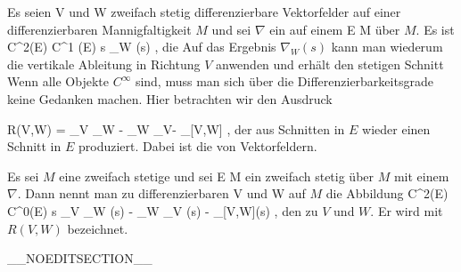 \setcounter{section}{28}


Es seien
\mathkor {} {V} {und} {W} {}
zweifach stetig differenzierbare Vektorfelder auf einer differenzierbaren Mannigfaltigkeit $M$ und sei $\nabla$ ein
auf einem
 { E } { M
} {}
über $M$. Es ist
 {C^2(E) } { C^1 (E)
} { s } { \nabla_W (s)
} {,}
die
Auf das Ergebnis $\nabla_W (s)$ kann man wiederum die vertikale Ableitung in Richtung $V$ anwenden und erhält den stetigen Schnitt
 Wenn alle Objekte $C^\infty$ sind, muss man sich über die Differenzierbarkeitsgrade keine Gedanken machen. Hier betrachten wir den Ausdruck

\mavergleichskettedisp
{\vergleichskette
{ R(V,W)
}
{ =} { \nabla_V \nabla_W - \nabla_W \nabla_V- \nabla_{[V,W]}
}
{ } {
}
{ } {
}
{ } {
}
}
{}{}{,}
der aus
 {} {}
Schnitten in $E$ wieder einen Schnitt in $E$ produziert. Dabei ist
\mathl{[V,W]}{} die
von Vektorfeldern.

{}
{

Es sei $M$ eine zweifach stetige
und sei
\maabb {} { E } { M
} {}
ein zweifach stetig
über $M$ mit einem
$\nabla$. Dann nennt man zu differenzierbaren
\mathkor {} {V} {und} {W} {}
auf $M$ die Abbildung
\maabbeledisp {} {C^2(E)} {C^0(E)
} { s } { \nabla_V \nabla_W (s) - \nabla_W \nabla_V (s) - \nabla_{[V,W]}(s)
} {,}
den
zu $V$ und $W$. Er wird mit $R(V,W)$ bezeichnet.

}

__NOEDITSECTION__


